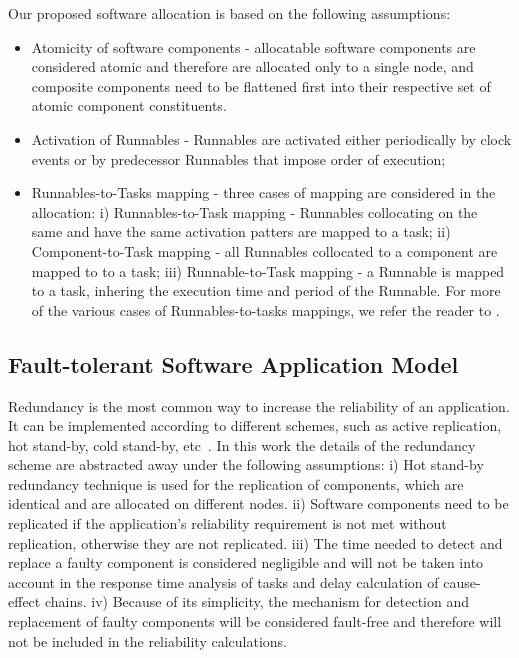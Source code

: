 Our proposed software allocation is based on the following assumptions:
\begin{itemize}
\item Atomicity of software components - allocatable software components are considered atomic and therefore are allocated only to a single node, and composite components need to be flattened first into their respective set of atomic component constituents.
\item Activation of Runnables - Runnables are activated either periodically by clock events or by predecessor Runnables that impose order of execution;
\item Runnables-to-Tasks mapping - three cases of mapping are considered in the allocation: i) Runnables-to-Task mapping - Runnables collocating on the same and have the same activation patters are mapped to a task; ii) Component-to-Task mapping - all Runnables collocated to a component are mapped to to a task; iii) Runnable-to-Task mapping - a Runnable is mapped to a task, inhering the execution time and period of the Runnable. For more of the various cases of Runnables-to-tasks mappings, we refer the reader to \cite{AUTOSAR2017SpecificationSoftware}.
\end{itemize}

\subsection{Fault-tolerant Software Application Model}
Redundancy is the most common way to increase the reliability of an application. It can be implemented according to different schemes, such as active replication, hot stand-by, cold stand-by, etc~\cite{Dubrova2013Fault-tolerantDesign}. In this work the details of the redundancy scheme are abstracted away under the following assumptions: i) Hot stand-by redundancy technique is used for the replication of components, which are identical and are allocated on different nodes. ii) Software components need to be replicated if the application's reliability requirement is not met without replication, otherwise they are not replicated. iii) The time needed to detect and replace a faulty component is considered negligible and will not be taken into account in the response time analysis of tasks and delay calculation of cause-effect chains. iv) Because of its simplicity, the mechanism for detection and replacement of faulty components will be considered fault-free and therefore will not be included in the reliability calculations.


